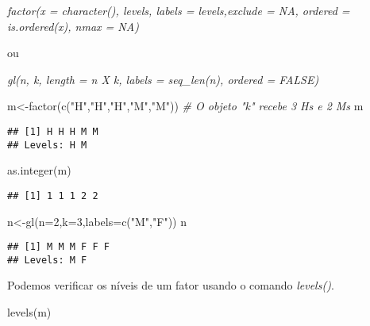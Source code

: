\documentclass[
]{book}
\newenvironment{Shaded}{\begin{snugshade}}{\end{snugshade}}
\newcommand{\AttributeTok}[1]{\textcolor[rgb]{0.77,0.63,0.00}{#1}}
\newcommand{\CommentTok}[1]{\textcolor[rgb]{0.56,0.35,0.01}{\textit{#1}}}
\newcommand{\DecValTok}[1]{\textcolor[rgb]{0.00,0.00,0.81}{#1}}
\newcommand{\FunctionTok}[1]{\textcolor[rgb]{0.00,0.00,0.00}{#1}}
\newcommand{\NormalTok}[1]{#1}
\newcommand{\OtherTok}[1]{\textcolor[rgb]{0.56,0.35,0.01}{#1}}
\newcommand{\StringTok}[1]{\textcolor[rgb]{0.31,0.60,0.02}{#1}}
\begin{document}
\emph{\emph{factor(x = character(), levels, labels = levels,exclude = NA, ordered = is.ordered(x), nmax = NA)}}

ou

\emph{\emph{gl(n, k, length = n X k, labels = seq\_len(n), ordered = FALSE)}}

\begin{Shaded}
\begin{Highlighting}[]
\NormalTok{m}\OtherTok{\textless{}{-}}\FunctionTok{factor}\NormalTok{(}\FunctionTok{c}\NormalTok{(}\StringTok{"H"}\NormalTok{,}\StringTok{"H"}\NormalTok{,}\StringTok{"H"}\NormalTok{,}\StringTok{"M"}\NormalTok{,}\StringTok{"M"}\NormalTok{)) }\CommentTok{\# O objeto "k" recebe 3 H\textquotesingle{}s e 2 M\textquotesingle{}s}
\NormalTok{m}
\end{Highlighting}
\end{Shaded}

\begin{verbatim}
## [1] H H H M M
## Levels: H M
\end{verbatim}

\begin{Shaded}
\begin{Highlighting}[]
\FunctionTok{as.integer}\NormalTok{(m)}
\end{Highlighting}
\end{Shaded}

\begin{verbatim}
## [1] 1 1 1 2 2
\end{verbatim}

\begin{Shaded}
\begin{Highlighting}[]
\NormalTok{n}\OtherTok{\textless{}{-}}\FunctionTok{gl}\NormalTok{(}\AttributeTok{n=}\DecValTok{2}\NormalTok{,}\AttributeTok{k=}\DecValTok{3}\NormalTok{,}\AttributeTok{labels=}\FunctionTok{c}\NormalTok{(}\StringTok{"M"}\NormalTok{,}\StringTok{"F"}\NormalTok{)) }
\NormalTok{n}
\end{Highlighting}
\end{Shaded}

\begin{verbatim}
## [1] M M M F F F
## Levels: M F
\end{verbatim}

Podemos verificar os níveis de um fator usando o comando \emph{levels()}.

\begin{Shaded}
\begin{Highlighting}[]
\FunctionTok{levels}\NormalTok{(m)}
\end{Highlighting}
\end{Shaded}
\end{document}
